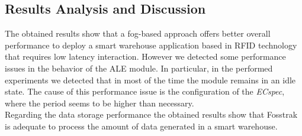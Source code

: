 \subsection{Results Analysis and Discussion}
\label{sub:results_analysis_discussion}
The obtained results show that a fog-based approach offers better overall performance to deploy a
smart warehouse application based in RFID technology that requires low latency interaction. However
we detected some performance issues in the behavior of the \gls{ALE} module. In particular, in the
performed experiments we detected that in most of the time the module remains in an idle state.
The cause of this performance issue is the configuration of the \textit{ECspec}, where the period seems to
be higher than necessary.\\

Regarding the data storage performance the obtained results show that Fosstrak is adequate
to process the amount of data generated in a smart warehouse.
